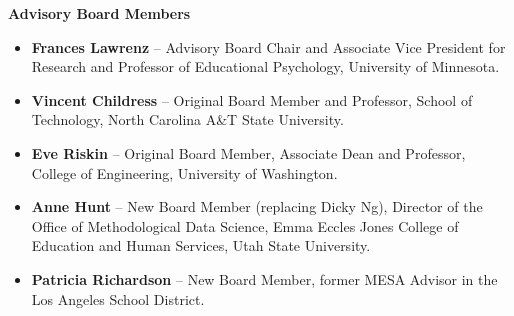 \documentclass[11pt]{article}
\begin{document}
\vspace{1em}

\noindent\textbf{Advisory Board Members}
\begin{itemize}
  \item \textbf{Frances Lawrenz} – Advisory Board Chair and Associate Vice President for Research and Professor of Educational Psychology, University of Minnesota.
  \item \textbf{Vincent Childress} – Original Board Member and Professor, School of Technology, North Carolina A\&T State University.
  \item \textbf{Eve Riskin} – Original Board Member, Associate Dean and Professor, College of Engineering, University of Washington.
  \item \textbf{Anne Hunt} – New Board Member (replacing Dicky Ng), Director of the Office of Methodological Data Science, Emma Eccles Jones College of Education and Human Services, Utah State University.
  \item \textbf{Patricia Richardson} – New Board Member, former MESA Advisor in the Los Angeles School District.
\end{itemize}
\end{document}
